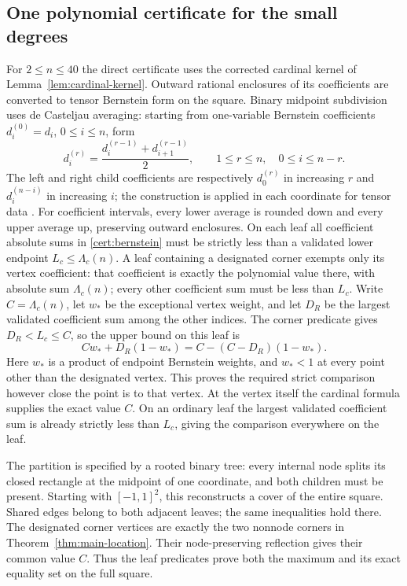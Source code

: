 \subsection{One polynomial certificate for the small degrees}
For $2\leq n\leq40$ the direct certificate uses the corrected cardinal
kernel of Lemma~\ref{lem:cardinal-kernel}. Outward rational enclosures of
its coefficients are converted to tensor Bernstein form on the square.
Binary midpoint subdivision uses de Casteljau averaging: starting from
one-variable Bernstein coefficients $d_i^{(0)}=d_i$, $0\leq i\leq n$,
form
\[
 d_i^{(r)}=\frac{d_i^{(r-1)}+d_{i+1}^{(r-1)}}2,
 \qquad 1\leq r\leq n,\quad 0\leq i\leq n-r.
\]
The left and right child coefficients are respectively $d_0^{(r)}$
in increasing $r$ and $d_i^{(n-i)}$ in increasing $i$; the construction
is applied in each coordinate for tensor data \cite{Lorentz1986}.
For coefficient intervals, every lower average is rounded down and every
upper average up, preserving outward enclosures. On each leaf
all coefficient absolute sums in \eqref{cert:bernstein} must be strictly
less than a validated lower endpoint $L_c\leq\Lambda_c(n)$.
A leaf containing a designated corner exempts only its vertex coefficient:
that coefficient is exactly the polynomial value there, with absolute sum
$\Lambda_c(n)$; every other coefficient sum must be less than $L_c$.
Write $C=\Lambda_c(n)$, let $w_*$ be the exceptional
vertex weight, and let $D_R$ be the largest validated coefficient sum
among the other indices. The corner predicate gives $D_R<L_c\leq C$,
so the upper bound on this leaf is
\[
 Cw_*+D_R(1-w_*)=C-(C-D_R)(1-w_*).
\]
Here $w_*$ is a product of endpoint Bernstein weights, and $w_*<1$
at every point other than the designated vertex. This proves the
required strict comparison however close the point is to that vertex.
At the vertex itself the cardinal formula supplies the exact value $C$.
On an ordinary leaf the largest validated coefficient sum is already
strictly less than $L_c$, giving the comparison everywhere on the leaf.

The partition is specified by a rooted binary tree: every internal node
splits its closed rectangle at the midpoint of one coordinate, and both
children must be present. Starting with $[-1,1]^2$, this reconstructs a
cover of the entire square. Shared edges belong to both adjacent leaves;
the same inequalities hold there. The designated corner vertices are
exactly the two nonnode corners in Theorem~\ref{thm:main-location}.
Their node-preserving reflection gives their common value $C$.
Thus the leaf predicates prove both the maximum and its exact equality
set on the full square.

